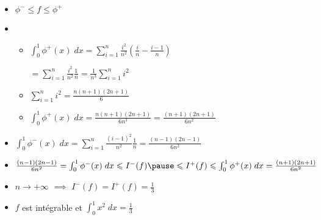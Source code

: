 \begin{frame}

\begin{exemple}[$\int_0^1 x^2 \; dx$]

\hfill
\begin{minipage}{0.40\textwidth}
\end{minipage}



\pause
\pause
\pause
\pause
\vspace*{-30mm}
\begin{itemize}
  \item $\phi^- \le f \le \phi^+$
\pause

  \item 
  \begin{itemize}
     \item $\int_0^1 \phi^+(x)\; dx = \sum_{i=1}^n  \frac{i^2}{n^2} \left(\frac in - \frac{i-1}{n}\right) $

\qquad $= \sum_{i=1}^n  \frac{i^2}{n^2} \frac 1n  = \frac{1}{n^3} \sum_{i=1}^n i^2$
\pause

     \item $\sum_{i=1}^n i^2=\tfrac{n(n + 1)(2n + 1)}{6}$
\pause

     \item $\int_0^1 \phi^+(x)\; dx = \frac{n(n + 1)(2n + 1)}{6n^3} =  \frac{(n + 1)(2n + 1)}{6n^2}$
  \end{itemize}
\pause

  \item $\int_0^1 \phi^-(x)\; dx = \sum_{i=1}^n  \frac{(i-1)^2}{n^2} \frac 1n 
=   \frac{(n - 1)(2n - 1)}{6n^2}$
\pause

  \item {\footnotesize $\frac{(n - 1)(2n - 1)}{6n^2}=\int_0^1 \phi^-(x)\; dx \le I^-(f) 
\pause
\le I^+(f) \le \int_0^1 \phi^+(x)\; dx =\frac{(n + 1)(2n + 1)}{6n^2}$}

\pause

  \item $n \to +\infty$ $\implies$ $I^-(f)= I^+(f)=\frac13$
\pause

  \item $f$ est intégrable et $\int_0^1 x^2\; dx = \frac13$
\end{itemize}

\end{exemple}
\end{frame}





